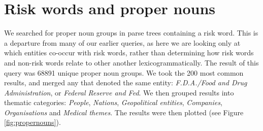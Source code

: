 \section{Risk words and proper nouns} \FloatBarrier

    We searched for proper noun groups in parse trees containing a risk word. This is a departure from many of our earlier queries, as here we are looking only at which entities co-occur with risk words, rather than determining how risk words and non-risk words relate to other another lexicogrammatically. The result of this query was 68891 unique proper noun groups. We took the 200 most common results, and merged any that denoted the same entity: \emph{F.D.A.\slash Food and Drug Administration}, or \emph{Federal Reserve and Fed}. We then grouped results into thematic categories: \emph{People}, \emph{Nations}, \emph{Geopolitical entities}, \emph{Companies}, \emph{Organisations} and \emph{Medical themes}. The results were then plotted (see Figure \ref{fig:propernouns}). 

